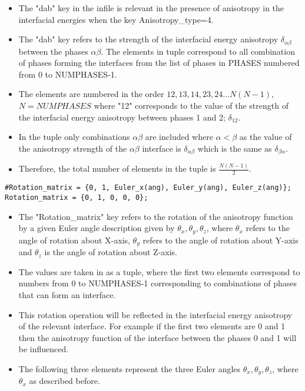 \documentclass[a4paper,10pt]{article}
\begin{document}
\begin{itemize}
 \item The "dab" key in the infile is relevant in the presence of anisotropy in the interfacial energies when the key Anisotropy\_type=4.
 \item The "dab" key refers to the strength of the interfacial energy anisotropy $\delta_{\alpha\beta}$ between the phases $\alpha\beta$. 
 The elements in tuple correspond to all combination of phases forming the interfaces from the list of phases in PHASES numbered 
 from 0 to NUMPHASES-1.
 \item The elements are numbered in the order ${12,13,14,23,24 \ldots N(N-1)}$, $N=NUMPHASES$ where "12" corresponds to the value of the strength of the interfacial energy 
 anisotropy between phases 1 and 2; $\delta_{12}$.
 \item In the tuple only combinations $\alpha\beta$ are included where $\alpha<\beta$ as the value of the anisotropy strength of the $\alpha\beta$ interface is $\delta_{\alpha\beta}$ which is the same as 
 $\delta_{\beta\alpha}$.
 \item Therefore, the total number of elements in the tuple is $\frac{N(N-1)}{2}$.
\end{itemize}

\begin{lstlisting}
#Rotation_matrix = {0, 1, Euler_x(ang), Euler_y(ang), Euler_z(ang)};
Rotation_matrix = {0, 1, 0, 0, 0};
\end{lstlisting}

\begin{itemize}
 \item The "Rotation\_matrix" key refers to the rotation of the anisotropy function by a given Euler angle description given by $\theta_x, \theta_y,\theta_z$, where $\theta_x$ refers
 to the angle of rotation about X-axis, $\theta_y$ refers to the angle of rotation about Y-axis and $\theta_z$ is the angle of rotation about Z-axis.
 \item The values are taken in as a tuple, where the first two elements correspond to numbers from 0 to NUMPHASES-1 corresponding to combinations of 
 phases that can form an interface. 
 \item This rotation operation will be reflected in the interfacial energy anisotropy of the relevant interface. For example if the first two elements are 0 and 1 then the anisotropy function of the 
 interface between the phases 0 and 1 will be influenced.
 \item The following three elements represent the three Euler angles $\theta_x, \theta_y,\theta_z$, where $\theta_x$ as described before.
\end{itemize}
\end{document}
